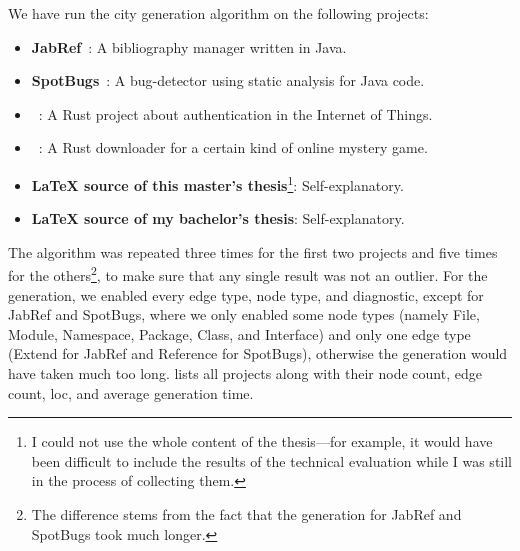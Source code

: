 \documentclass[../thesis]{subfiles}
\begin{document}
We have run the city generation algorithm on the following projects:
\begin{itemize}
	\item \textbf{JabRef}~\cite{jabref}: A bibliography manager written in Java.
	\item \textbf{SpotBugs}~\cite{spotbugs}: A bug-detector using static analysis for Java code.
	\item \textbf{}~\cite{dcaf}: A Rust project about authentication in the Internet of Things.
	\item \textbf{}~\cite{aaoffline}: A Rust downloader for a certain kind of online mystery game.
	\item \textbf{\LaTeX{} source of this master's thesis}\footnote{
		      I could not use the whole content of the thesis---for example, it would have been difficult to include the results of the technical evaluation while I was still in the process of collecting them.
	      }: Self-explanatory.
	\item \textbf{\LaTeX{} source of my bachelor's thesis}: Self-explanatory.
\end{itemize}

The algorithm was repeated three times for the first two projects and five times for the others\footnote{
	The difference stems from the fact that the generation for JabRef and SpotBugs took much longer.
}, to make sure that any single result was not an outlier.
For the generation, we enabled every edge type, node type, and diagnostic, except for JabRef and SpotBugs, where we only enabled some node types (namely File, Module, Namespace, Package, Class, and Interface) and only one edge type (Extend for JabRef and Reference for SpotBugs), otherwise the generation would have taken much too long.
 lists all projects along with their node count, edge count, \gls{loc}, and average generation time.
\end{document}
